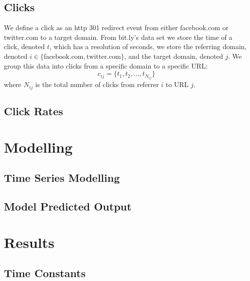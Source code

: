 \documentclass{article}
\begin{document}
    \subsection{Clicks}
    
    We define a click as an http 301 redirect event from either facebook.com or twitter.com to a target domain. From bit.ly's data set we store the time of a click, denoted $t$, which has a resolution of seconds, we store the referring domain, denoted $i \in \{\textrm{facebook.com}, \textrm{twitter.com} \}$, and the target domain, denoted $j$. We group this data into clicks from a specific domain to a specific URL: 
    \begin{equation}
        c_{ij} = \{t_1, t_2, \ldots, t_{N_{ij}}\}
    \end{equation}
    where $N_{ij}$ is the total number of clicks from referrer $i$ to URL $j$. 
    
    
    \subsection{Click Rates}
    
    \section{Modelling}
    
    \subsection{Time Series Modelling}
    
    \subsection{Model Predicted Output}
    
    \section{Results}
    
    \subsection{Time Constants}
    
\end{document}
